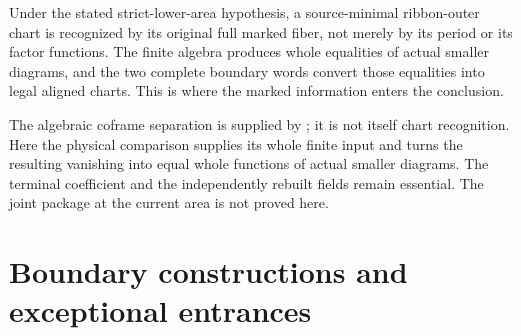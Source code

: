 \documentclass[11pt,a4paper]{amsart}
\numberwithin{equation}{section}
\theoremstyle{plain}
\theoremstyle{definition}
\begin{document}
Under the stated strict-lower-area hypothesis, a source-minimal
ribbon-outer chart is recognized by its original full marked fiber,
not merely by its period or its factor functions.  The finite algebra
produces whole equalities of actual smaller diagrams, and the two
complete boundary words convert those equalities into legal aligned
charts.  This is where the marked information enters the conclusion.

The algebraic coframe separation is supplied by
\cite{Shields2026Coframes}; it is not itself chart recognition.
Here the physical comparison supplies its whole finite input and turns
the resulting vanishing into equal whole functions of actual smaller
diagrams.  The terminal coefficient and the independently rebuilt
fields remain essential.  The joint package at the current area is
not proved here.

\appendix
\section{Boundary constructions and exceptional entrances}\label{app:boundary}
\end{document}
